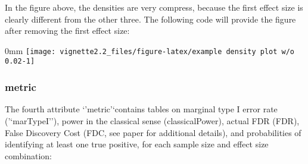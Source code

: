 \documentclass[]{article}
\newcommand{\hlnum}[1]{\textcolor[rgb]{0.816,0.125,0.439}{#1}}%
\newcommand{\hlstr}[1]{\textcolor[rgb]{0.251,0.627,0.251}{#1}}%
\newcommand{\hlstd}[1]{\textcolor[rgb]{0.251,0.251,0.251}{#1}}%
\newcommand{\hlkwc}[1]{\textcolor[rgb]{0.251,0.251,0.251}{#1}}%
\newcommand{\hlkwd}[1]{\textcolor[rgb]{0.878,0.439,0.125}{#1}}%
\newenvironment{Shaded}{\begin{myshaded}}{\end{myshaded}}
\newcommand{\KeywordTok}[1]{\hlkwd{#1}}
\newcommand{\DataTypeTok}[1]{\hlkwc{#1}}
\newcommand{\DecValTok}[1]{\hlnum{#1}}
\newcommand{\FloatTok}[1]{\hlnum{#1}}
\newcommand{\StringTok}[1]{\hlstr{#1}}
\newcommand{\OtherTok}[1]{{#1}}
\newcommand{\NormalTok}[1]{\hlstd{#1}}
\begin{document}
In the figure above, the densities are very compress, because the first
effect size is clearly different from the other three. The following
code will provide the figure after removing the first effect size:

\begin{Shaded}
\end{Shaded}

\begin{adjustwidth}{\fltoffset}{0mm}
\texttt{[image: vignette2.2\_files/figure-latex/example density plot w/o 0.02-1]} \end{adjustwidth}

\newpage

\subsubsection{metric}\label{metric}

The fourth attribute `'metric'`contains tables on marginal type I error
rate ('`marTypeI''), power in the classical sense (classicalPower),
actual FDR (FDR), False Discovery Cost (FDC, see paper for additional
details), and probabilities of identifying at least one true positive,
for each sample size and effect size combination:
\end{document}
